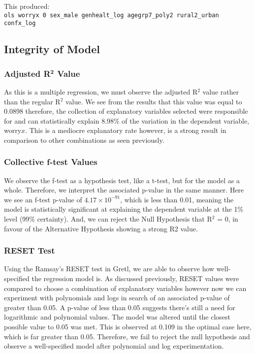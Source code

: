 \documentclass[11pt, english]{article}
\begin{document}
	This produced:\\

	\verb|ols worryx 0 sex_male genhealt_log agegrp7_poly2 rural2_urban confx_log|

	\newpage

	\subsection{Integrity of Model}

		\subsubsection{Adjusted R$\mathbf{^2}$ Value}

	As this is a multiple regression, we must observe the adjusted R$^2$ value rather than the regular R$^2$ value. We see from the results that this value was equal to 0.0898 therefore, the collection of explanatory variables selected were responsible for and can statistically explain 8.98\% of the variation in the dependent variable, worry$x$. This is a mediocre explanatory rate however, is a strong result in comparison to other combinations as seen previously.

		\subsubsection{Collective f-test Values}

	We observe the f-test as a hypothesis test, like a t-test, but for the model as a whole. Therefore, we interpret the associated p-value in the same manner. Here we see an f-test p-value of $4.17\times{10}^{-91}$, which is less than 0.01, meaning the model is statistically significant at explaining the dependent variable at the 1\% level (99\% certainty). And, we can reject the Null Hypothesis that R$^2$ = 0, in favour of the Alternative Hypothesis showing a strong R2 value. 

		\subsubsection{RESET Test}

	Using the Ramsay's RESET test in Gretl, we are able to observe how well-specified the regression model is. As discussed previously, RESET values were compared to choose a combination of explanatory variables however now we can experiment with polynomials and logs in search of an associated p-value of greater than 0.05. A p-value of less than 0.05 suggests there's still a need for logarithmic and polynomial values. The model was altered until the closest possible value to 0.05 was met. This is observed at 0.109 in the optimal case here, which is far greater than 0.05. Therefore, we fail to reject the null hypothesis and observe a well-specified model after polynomial and log experimentation.
\end{document}
